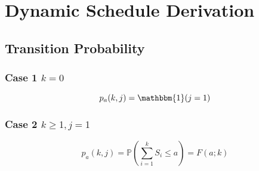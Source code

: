 \chapter{Dynamic Schedule Derivation}

\section{Transition Probability}
\subsection{Case 1 $k = 0$}
\begin{equation*}
	p_{a} (k, j) = \mathbbm{1} (j = 1)
\end{equation*}

\subsection{Case 2 $k \geq 1, j = 1$}
\begin{equation*}
	p_{a} (k, j) = \mathbb{P} \left( \sum_{i = 1}^{k} S_{i} \leq a \right) = F (a; k)
\end{equation*}

